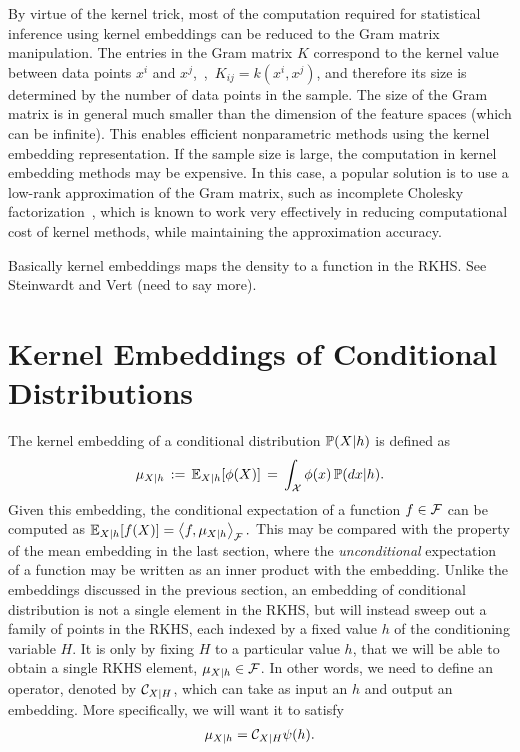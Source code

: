 \documentclass{article}
\begin{document}
By virtue of the kernel trick, most of the computation required for statistical inference using kernel embeddings can be reduced to the Gram matrix manipulation. The entries in the Gram matrix $K$ correspond to the kernel value between data points $x^i$ and $x^j$,~\ie,~$K_{ij} = k(x^i,x^j)$, and therefore its size is determined by the number of data points in the sample. The size of the Gram matrix is in general much smaller than the dimension of the feature spaces (which can be infinite). This enables efficient nonparametric methods using the kernel embedding representation. If the sample size is large, the computation in kernel embedding methods may be expensive. In this case, a popular solution is to use a low-rank approximation of the Gram matrix, such as incomplete Cholesky factorization~\cite{FinSch01}, which is known to work very effectively in reducing computational cost of kernel methods, while maintaining the approximation accuracy.

 Basically kernel embeddings maps the density to a function in the RKHS. See Steinwardt and Vert (need to say more).

\section{Kernel Embeddings of Conditional Distributions}
\label{sec:conditionalembedding}

The kernel embedding of a conditional distribution $\mathbb{P}(X|h)$ is defined as~\cite{SonHuaSmoFuk09}
\begin{align}
    \label{eq:conditionalembedding}
    \mu_{X|h}\, :=\, \mathbb{E}_{X|h}[\phi(X)]\, =\, \int_{\mathcal{X}} \phi(x) \, \mathbb{P}(dx|h).
\end{align}
Given this embedding, the conditional expectation of a function $f\in \mathcal{F}$  can be computed as
$
    \label{eq:conditionalexpectation}
    \mathbb{E}_{X|h}[f(X)] = \left\langle f,\mu_{X|h} \right\rangle_{\mathcal{F}}.
$
This may be compared with the property of the mean embedding in the last section,
where the {\em unconditional} expectation of a function may be written as an inner product with the embedding.
Unlike the embeddings discussed in the previous section, an embedding of conditional distribution is not a single element in the RKHS, but will instead sweep out a family of
points in the RKHS, each indexed by a fixed value $h$ of the conditioning variable $H$. It is only
by fixing $H$ to a particular value $h$, that we will be able to obtain a single RKHS element, $\mu_{X|h}\in\mathcal{F}$. In other words, we need to define an operator, denoted by $\mathcal{C}_{X|H}$, which can take as input an $h$ and output an embedding. More specifically, we will
want it to satisfy
\begin{align}
    \label{eq:conditionalembeddingrequirement}
    \mu_{X|h} = \mathcal{C}_{X|H} \psi(h).
\end{align}
\end{document}

